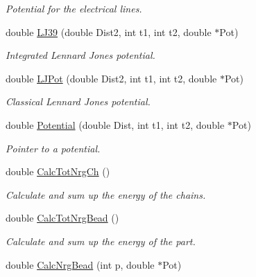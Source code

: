 \begin{DoxyCompactItemize}
\begin{DoxyCompactList}\small\item\em \-Potential for the electrical lines. \end{DoxyCompactList}\item 
\hypertarget{classForces_a28fd299b40762b1703462b830df2473d}{double \hyperlink{classForces_a28fd299b40762b1703462b830df2473d}{\-L\-J39} (double \-Dist2, int t1, int t2, double $\ast$\-Pot)}\label{classForces_a28fd299b40762b1703462b830df2473d}

\begin{DoxyCompactList}\small\item\em \-Integrated \-Lennard \-Jones potential. \end{DoxyCompactList}\item 
\hypertarget{classForces_ad6b11a62ba4f9871d598109fe007a121}{double \hyperlink{classForces_ad6b11a62ba4f9871d598109fe007a121}{\-L\-J\-Pot} (double \-Dist2, int t1, int t2, double $\ast$\-Pot)}\label{classForces_ad6b11a62ba4f9871d598109fe007a121}

\begin{DoxyCompactList}\small\item\em \-Classical \-Lennard \-Jones potential. \end{DoxyCompactList}\item 
\hypertarget{classForces_ac5ef477f97601b779392b8622ac6b1fe}{double \hyperlink{classForces_ac5ef477f97601b779392b8622ac6b1fe}{\-Potential} (double \-Dist, int t1, int t2, double $\ast$\-Pot)}\label{classForces_ac5ef477f97601b779392b8622ac6b1fe}

\begin{DoxyCompactList}\small\item\em \-Pointer to a potential. \end{DoxyCompactList}\item 
double \hyperlink{classForces_a59c5e973ca9b852115683c3cc2fc6035}{\-Calc\-Tot\-Nrg\-Ch} ()
\begin{DoxyCompactList}\small\item\em \-Calculate and sum up the energy of the chains. \end{DoxyCompactList}\item 
double \hyperlink{classForces_a279acbc4a6538860aad95a08f3edc78f}{\-Calc\-Tot\-Nrg\-Bead} ()
\begin{DoxyCompactList}\small\item\em \-Calculate and sum up the energy of the part. \end{DoxyCompactList}\item 
\hypertarget{classForces_a3fa7f92932bea2b6abd0231b7610b6d2}{double \hyperlink{classForces_a3fa7f92932bea2b6abd0231b7610b6d2}{\-Calc\-Nrg\-Bead} (int p, double $\ast$\-Pot)}\label{classForces_a3fa7f92932bea2b6abd0231b7610b6d2}


\end{DoxyCompactItemize}
